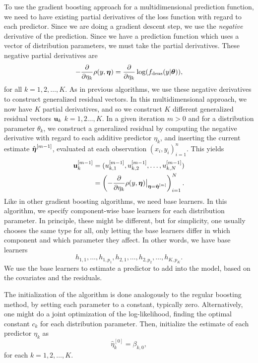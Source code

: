 To use the gradient boosting approach for a multidimensional prediction function, we need to have existing partial derivatives of
the loss function with regard to each predictor. Since we are doing a gradient descent step, we use the \textit{negative} derivative of the prediction. Since we have a prediction function which uses a vector of distribution parameters, we must take the partial derivatives.
These negative partial derivatives are
\begin{equation}
    -\frac{\partial}{\partial\eta_k}\rho(y,\boldsymbol{\eta})=\frac{\partial}{\partial\eta_k}\log(f_{\text{dens}}(y|\boldsymbol{\theta})),
\end{equation}
for all $k=1,2,\ldots,K$. As in previous algorithms, we use these negative derivatives to construct generalized residual vectors.
In this multidimensional approach, we now have $K$ partial derivatives, and so we construct $K$ different generalized residual vectors $\mathbf{u}_k$
$k=1,2\ldots,K$. In a given iteration $m>0$ and for a distribution parameter $\theta_k$,
we construct a generalized residual by computing the negative derivative with regard to each additive predictor $\eta_k$, and inserting
the current estimate $\hat{\boldsymbol{\eta}}^{[m-1]}$, evaluated at each observation $(x_i,y_i)_{i=1}^n$. This yields
\begin{align*}
    \mathbf{u}_k^{[m-1]}&=(u_{k,1}^{[m-1]},u_{k,2}^{[m-1]},\ldots,u_{k,N}^{[m-1]})\\
    &=\left(-\frac{\partial}{\partial \eta_k}\rho(y,\boldsymbol{\eta})\big\rvert_{\boldsymbol{\eta}=\hat{\boldsymbol{\eta}}^{[m]}}\right)_{i=1}^N.
\end{align*}
Like in other gradient boosting algorithms, we need base learners. In this algorithm, we specify component-wise base learners for each
distribution parameter. In principle, these might be different, but for simplicity, one usually chooses the same type for all,
only letting the base learners differ in which component and which parameter they affect. In other words, we have base learners
\begin{equation}
    h_{1,1},\ldots,h_{1,p_1},h_{2,1},\ldots,h_{2,p_2},\ldots,h_{K,p_K}.
\end{equation}
We use the base learners to estimate a predictor to add into the model, based on the covariates and the residuals.

The initialization of the algorithm is done analogously to the regular boosting method, by setting each parameter to a constant, typically zero.
Alternatively, one might do a joint optimization of the log-likelihood, finding the optimal constant $c_k$ for each distribution parameter.
Then, initialize the estimate of each predictor $\eta_k$ as
\begin{equation}
    \hat{\eta}_k^{[0]}=\beta_{k,0},
\end{equation}
for each $k=1,2,\ldots,K$.

